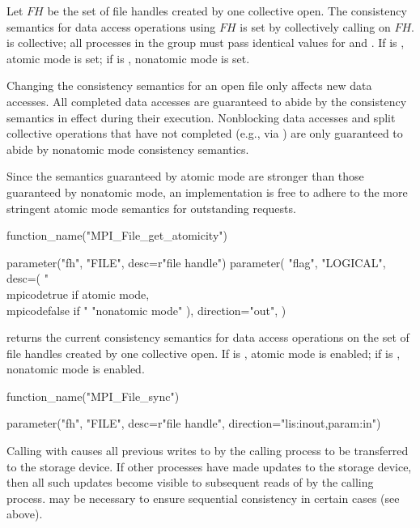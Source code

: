 Let $FH$ be the set of file handles created by one collective open.
The consistency semantics for data access operations using $FH$
is set by collectively calling  on $FH$.
 is collective;
all processes in the group must pass identical values for
 and .
If  is , atomic mode is set;
if  is , nonatomic mode is set.

Changing the consistency semantics for an open file only affects new
data accesses.  All completed data accesses are guaranteed to abide
by the consistency semantics in effect during their execution.
Nonblocking data accesses
and split collective operations
that
have not completed
(e.g., via ) are only guaranteed
to abide by nonatomic mode consistency semantics.

\begin{implementors}
Since the semantics guaranteed by atomic mode are stronger than
those guaranteed by nonatomic mode, an implementation is
free to adhere to the more stringent atomic mode semantics
for outstanding requests.
\end{implementors}

%
\begin{mpi-binding}
    function_name("MPI_File_get_atomicity")
    
    parameter("fh", "FILE", desc=r"file handle")
    parameter(
        "flag",
        "LOGICAL",
        desc=(
            "\\mpicode{true} if atomic mode, \\mpicode{false} if "
            "nonatomic mode"
        ),
        direction="out",
    )
\end{mpi-binding}

 returns
the current consistency semantics for
data access operations on
the set of file handles created by one collective open.
If  is , atomic mode is enabled;
if  is , nonatomic mode is enabled.

%
\begin{mpi-binding}
    function_name("MPI_File_sync")
    
    parameter("fh", "FILE", desc=r"file handle", direction="lis:inout,param:in")
\end{mpi-binding}

Calling  with  causes
all previous writes to  by the calling process 
to be transferred to the storage device.
If other processes have made updates to the storage device,
then all such updates become visible to
subsequent reads of  by the calling process.
may be necessary to ensure sequential consistency in certain
cases (see above).

